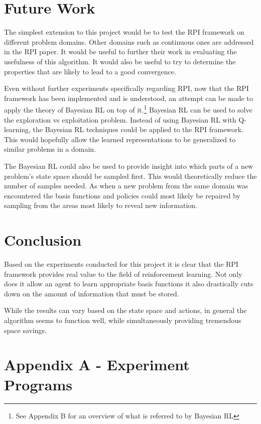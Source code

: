 \documentclass[12pt, letterpaper, final]{report}
\begin{document}
\section{Future Work}

The simplest extension to this project would be to test the RPI
framework on different problem domains. Other domains such as
continuous ones are addressed in the RPI paper. It would be useful to
further their work in evaluating the usefulness of this algorithm. It
would also be useful to try to determine the properties that are
likely to lead to a good convergence.

Even without further experiments specifically regarding RPI, now that
the RPI framework has been implemented and is understood, an attempt
can be made to apply the theory of Bayesian RL on
top of it.\footnote{See Appendix B for an overview of what is
  referred to by Bayesian RL} Bayesian RL can be used to solve
the exploration vs exploitation problem. Instead of using Bayesian RL
with Q-learning, the Bayesian RL techniques could be applied to the
RPI framework. This would hopefully allow the learned representations
to be generalized to similar problems in a domain. 

The Bayesian RL could also be used to provide insight into which parts
of a new problem's state space should be sampled first. This would
theoretically reduce the number of samples needed. As when a new
problem from the same domain was encountered the basis
functions and policies could most likely be repaired by sampling from
the areas most likely to reveal new information.

\section{Conclusion}

Based on the experiments conducted for this project it is clear that
the RPI framework provides real value to the field of reinforcement
learning. Not only does it allow an agent to learn appropriate basis
functions it also drastically cuts down on the amount of information
that must be stored.

While the results can vary based on the state space and actions, in
general the algorithm seems to function well, while simultaneously
providing tremendous space savings.




\section{Appendix A - Experiment Programs}
\end{document}
